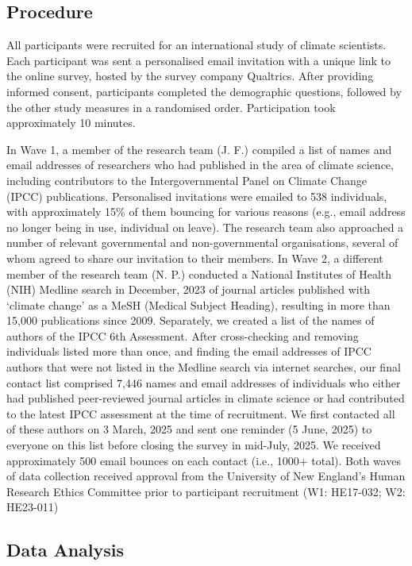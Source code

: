 \documentclass[
  man,
  longtable,
  nolmodern,
  notxfonts,
  notimes,
  colorlinks=true,linkcolor=blue,citecolor=blue,urlcolor=blue]{apa7}
\begin{document}
\subsection{Procedure}\label{procedure}

All participants were recruited for an international study of climate
scientists. Each participant was sent a personalised email invitation
with a unique link to the online survey, hosted by the survey company
Qualtrics. After providing informed consent, participants completed the
demographic questions, followed by the other study measures in a
randomised order. Participation took approximately 10 minutes.

In Wave 1, a member of the research team (J. F.) compiled a list of
names and email addresses of researchers who had published in the area
of climate science, including contributors to the Intergovernmental
Panel on Climate Change (IPCC) publications. Personalised invitations
were emailed to 538 individuals, with approximately 15\% of them
bouncing for various reasons (e.g., email address no longer being in
use, individual on leave). The research team also approached a number of
relevant governmental and non-governmental organisations, several of
whom agreed to share our invitation to their members. In Wave 2, a
different member of the research team (N. P.) conducted a National
Institutes of Health (NIH) Medline search in December, 2023 of journal
articles published with `climate change' as a MeSH (Medical Subject
Heading), resulting in more than 15,000 publications since 2009.
Separately, we created a list of the names of authors of the IPCC 6th
Assessment. After cross-checking and removing individuals listed more
than once, and finding the email addresses of IPCC authors that were not
listed in the Medline search via internet searches, our final contact
list comprised 7,446 names and email addresses of individuals who either
had published peer-reviewed journal articles in climate science or had
contributed to the latest IPCC assessment at the time of recruitment. We
first contacted all of these authors on 3 March, 2025 and sent one
reminder (5 June, 2025) to everyone on this list before closing the
survey in mid-July, 2025. We received approximately 500 email bounces on
each contact (i.e., 1000+ total). Both waves of data collection received
approval from the University of New England's Human Research Ethics
Committee prior to participant recruitment (W1: HE17-032; W2: HE23-011)

\subsection{Data Analysis}\label{data-analysis}
\end{document}
